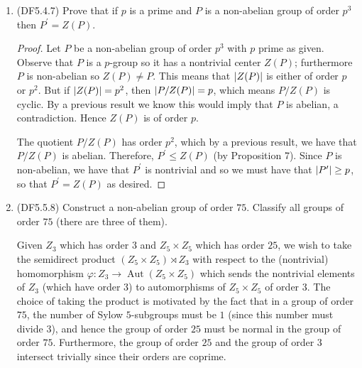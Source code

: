 \documentclass[11pt]{article}
\newcommand{\cbr}[1]{\left\{#1\right\}}
\DeclareMathOperator\Aut{Aut}
\begin{document}
\begin{enumerate}
\begin{proof}
      Because $gPg^{-1}\leq N_G(W) \leq G$ and both $P, gPg^{-1}$ are Sylow $p$-subgroups of $G$, it follows that $P, gPg^{-1}$ are Sylow $p$-subgroups of $N_G(W)$ and so are conjugate to each other in $N_G(W)$. There exists $n\in N_G(W)$ such that $P = ngPg^{-1}n^{-1} = ngP (ng)^{-1}$, and so $ng \in N_G(P)$.
      
      Since $gUg^{-1} = W$ and $n\in N_G(W)$, we have \[ng U (ng)^{-1} = ng U g^{-1}n^{-1} = nWn^{-1} = W,\] so that $ng$ sends $U$ to $W$ by conjugation. Since $ng \in N_G(P)$, we have that $U$ is conjugate to $W$ in $N_G(P)$.

      The center $Z(P)$ is normal in $P$, so that the singleton subsets $U = \cbr{u}$ and $W = \cbr{w}$ of $Z(P)$ are normal subsets of $P$. It follows by the above result that the two elements $u,w\in Z(P)$ are conjugate (since the singleton sets $U$ and $W$ are conjugate) in $G$ if and only if they are conjugate in $N_G(P)$.
    \end{proof}
    \item (DF5.4.7) Prove that if $p$ is a prime and $P$ is a non-abelian group of order $p^3$ then $P^{\prime} = Z(P)$.
    \begin{proof}
      Let $P$ be a non-abelian group of order $p^3$ with $p$ prime as given. Observe that $P$ is a $p$-group so it has a nontrivial center $Z(P)$; furthermore $P$ is non-abelian so $Z(P)\neq P$. This means that $\abs{Z(P)}$ is either of order $p$ or $p^2$. But if $\abs{Z(P)} = p^2$, then $\abs{P/Z(P)} = p$, which means $P/Z(P)$ is cyclic. By a previous result we know this would imply that $P$ is abelian, a contradiction. Hence $Z(P)$ is of order $p$. 

      The quotient $P/Z(P)$ has order $p^2$, which by a previous result, we have that $P/Z(P)$ is abelian. Therefore, $P^{\prime}\leq Z(P)$ (by Proposition 7). Since $P$ is non-abelian, we have that $P^{\prime}$ is nontrivial and so we must have that $\abs{P^{\prime}} \geq p$, so that $P^{\prime} = Z(P)$ as desired.
    \end{proof}
    \item (DF5.5.8) Construct a non-abelian group of order $75$. Classify all groups of order $75$ (there are three of them).
    
    Given $Z_3$ which has order $3$ and $Z_5\times Z_5$ which has order $25$, we wish to take the semidirect product $(Z_5\times Z_5)\rtimes Z_3$ with respect to the (nontrivial) homomorphism $\varphi\colon Z_3 \to \Aut(Z_5\times Z_5)$ which sends the nontrivial elements of $Z_3$ (which have order $3$) to automorphisms of $Z_5\times Z_5$ of order $3$. The choice of taking the product is motivated by the fact that in a group of order $75$, the number of Sylow $5$-subgroups must be $1$ (since this number must divide $3$), and hence the group of order $25$ must be normal in the group of order $75$. Furthermore, the group of order $25$ and the group of order $3$ intersect trivially since their orders are coprime.
    

\end{enumerate}
\end{document}

